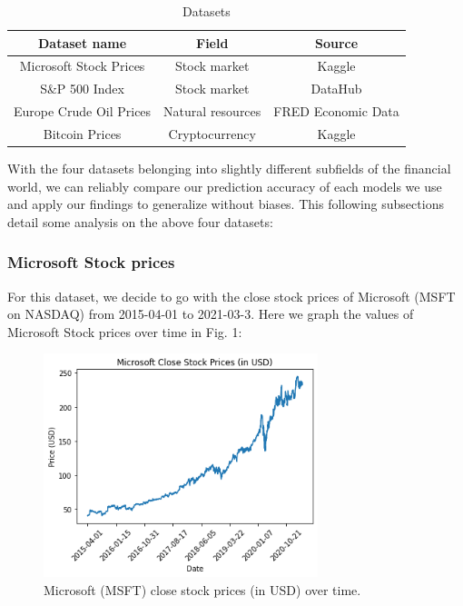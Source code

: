 \documentclass[letterpaper, 10 pt, conference]{ieeeconf}  %
\begin{document}
    \begin{table}[h!] \centering
        \caption{Datasets }
        \begin{threeparttable}
                \begin{tabular}{|c||c|c|}
                    \hline
                    Dataset name & Field & Source\\
                    \hline
                    Microsoft Stock Prices & Stock market & Kaggle\tablefootnote{\url{https://www.kaggle.com/vijayvvenkitesh/microsoft-stock-time-series-analysis}}\\
                    S\&P 500 Index & Stock market & DataHub\tablefootnote{\url{https://datahub.io/core/s-and-p-500}}\\
                    Europe Crude Oil Prices & Natural resources & FRED Economic Data\tablefootnote{\url{https://fred.stlouisfed.org/series/DCOILBRENTEU}}\\
                    Bitcoin Prices & Cryptocurrency & Kaggle\tablefootnote{\url{https://www.kaggle.com/sudalairajkumar/cryptocurrencypricehistory}}\\
                    \hline
                \end{tabular}
        \end{threeparttable}
    \end{table}

    With the four datasets belonging into slightly different subfields of the financial world, we can reliably compare our prediction accuracy of each models we use and apply our findings to generalize without biases. This following subsections detail some analysis on the above four datasets:

    \subsubsection{Microsoft Stock prices} For this dataset, we decide to go with the close stock prices of Microsoft (MSFT on NASDAQ) from 2015-04-01 to 2021-03-3. Here we graph the values of Microsoft Stock prices over time in Fig. 1:
    \begin{figure}[thpb]
        \centering
        \includegraphics[width=8cm]{1.png}
        \caption{Microsoft (MSFT) close stock prices (in USD) over time.}
        \label{figurelabel}
     \end{figure}
    
\end{document}
